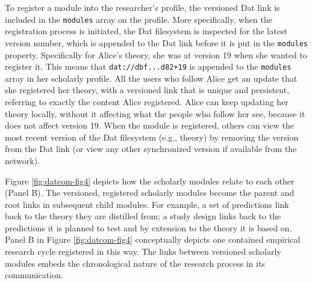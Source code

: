 \documentclass[a5paper]{book}
\begin{document}
To register a module into the researcher's profile, the versioned Dat
link is included in the \texttt{modules} array on the profile. More
specifically, when the registration process is initiated, the Dat
filesystem is inspected for the latest version number, which is appended
to the Dat link before it is put in the \texttt{modules} property.
Specifically for Alice's theory, she was at version 19 when she wanted
to register it. This means that \texttt{dat://dbf...d82+19} is appended
to the \texttt{modules} array in her scholarly profile. All the users
who follow Alice get an update that she registered her theory, with a
versioned link that is unique and persistent, referring to exactly the
content Alice registered. Alice can keep updating her theory locally,
without it affecting what the people who follow her see, because it does
not affect version 19. When the module is registered, others can view
the most recent version of the Dat filesystem (e.g., theory) by removing
the version from the Dat link (or view any other synchronized version if
available from the network).

Figure \ref{fig:datcom-fig4} depicts how the scholarly modules relate to
each other (Panel B). The versioned, registered scholarly modules become
the parent and root links in subsequent child modules. For example, a
set of predictions link back to the theory they are distilled from; a
study design links back to the predictions it is planned to test and by
extension to the theory it is based on. Panel B in Figure
\ref{fig:datcom-fig4} conceptually depicts one contained empirical
research cycle registered in this way. The links between versioned
scholarly modules embeds the chronological nature of the research
process in its communication.
\end{document}
